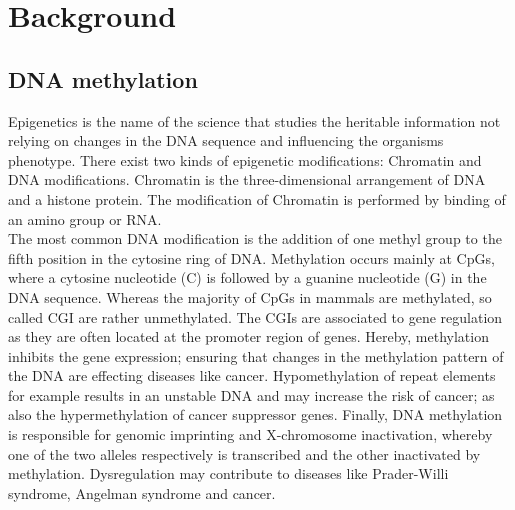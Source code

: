 \pagestyle{headings}
\chapter{Background}
\label{chapter:background}
\section{DNA methylation} 
\label{section:DNAMeth} 
Epigenetics is the name of the science that studies the heritable information not relying on changes in the DNA sequence and influencing the organisms phenotype. There exist two kinds of epigenetic modifications: Chromatin and DNA modifications. Chromatin is the three-dimensional arrangement of DNA and a histone protein. The modification of Chromatin is performed by binding of an amino group or RNA.\cite{Epigenetics}\\

The most common DNA modification is the addition of one methyl group to the fifth position in the cytosine ring of DNA. Methylation occurs mainly at \acp{CpG}, where a cytosine nucleotide (C) is followed by a guanine nucleotide (G) in the DNA sequence.\cite{DNAMethylation} Whereas the majority of CpGs in mammals are methylated, so called \ac{CGI} are rather unmethylated. The \acp{CGI} are associated to gene regulation as they are often located at the promoter region of genes. Hereby, methylation inhibits the gene expression; ensuring that changes in the methylation pattern of the DNA are effecting diseases like cancer.\cite{Handbook} Hypomethylation of repeat elements for example results in an unstable DNA and may increase the risk of cancer; as also the hypermethylation of cancer suppressor genes.\cite{DNAMethylation} Finally, DNA methylation is responsible for genomic imprinting and X-chromosome inactivation, whereby one of the two alleles respectively is transcribed and the other inactivated by methylation. Dysregulation may contribute to diseases like Prader-Willi syndrome, Angelman syndrome and cancer. \cite{Walter}\\

